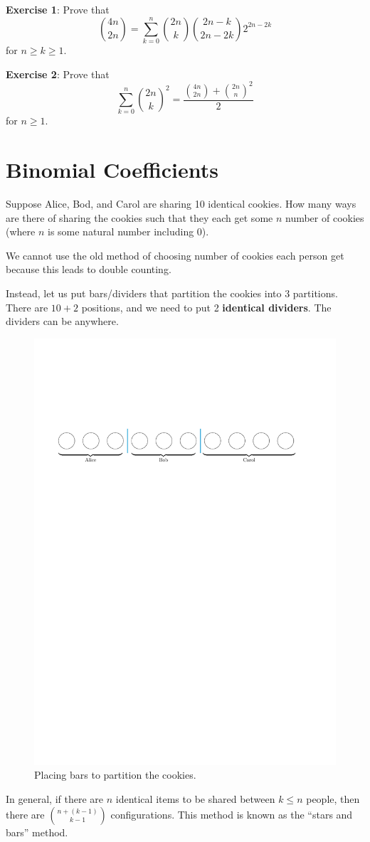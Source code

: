 \textbf{Exercise 1}: Prove that
$$
\binom{4n}{2n} = \sum_{k=0}^n \binom{2n}{k} \binom{2n-k}{2n-2k} 2^{2n-2k}
$$
for $n \geq k \geq 1$.

\textbf{Exercise 2}: Prove that
$$
\sum_{k=0}^n \binom{2n}{k}^2 = \frac{\binom{4n}{2n} + \binom{2n}{n}^2}{2}
$$
for $n \geq 1$.

\section{Binomial Coefficients}

Suppose Alice, Bod, and Carol are sharing 10 identical cookies. How many ways are there of sharing the cookies such that they each get some $n$ number of cookies (where $n$ is some natural number including 0).

We cannot use the old method of choosing number of cookies each person get because this leads to double counting.

Instead, let us put bars/dividers that partition the cookies into 3 partitions. There are $10 + 2$ positions, and we need to put 2 \textbf{identical dividers}. The dividers can be anywhere.

\begin{figure}[htbp]
    \centering
    \includegraphics[width=.6\linewidth]{figures/cookie-distribution.pdf}
    \caption{Placing bars to partition the cookies.}
    \label{fig:cookie-distribution}
\end{figure}

In general, if there are $n$ identical items to be shared between $k \leq n$ people, then there are $\binom{n+(k-1)}{k-1}$ configurations. This method is known as the ``stars and bars'' method.

